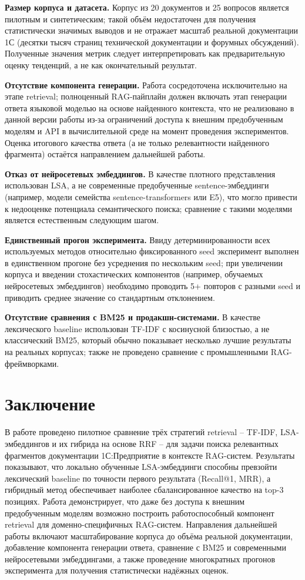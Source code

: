 \documentclass[11pt]{article}
\begin{document}
\textbf{Размер корпуса и датасета.} Корпус из 20 документов и 25 вопросов
является пилотным и синтетическим; такой объём недостаточен для получения
статистически значимых выводов и не отражает масштаб реальной документации
1С (десятки тысяч страниц технической документации и форумных обсуждений).
Полученные значения метрик следует интерпретировать как предварительную
оценку тенденций, а не как окончательный результат.

\textbf{Отсутствие компонента генерации.} Работа сосредоточена
исключительно на этапе retrieval; полноценный RAG-пайплайн должен включать
этап генерации ответа языковой моделью на основе найденного контекста, что
не реализовано в данной версии работы из-за ограничений доступа к внешним
предобученным моделям и API в вычислительной среде на момент проведения
экспериментов. Оценка итогового качества ответа (а не только релевантности
найденного фрагмента) остаётся направлением дальнейшей работы.

\textbf{Отказ от нейросетевых эмбеддингов.} В качестве плотного
представления использован LSA, а не современные предобученные
sentence-эмбеддинги (например, модели семейства sentence-transformers или
E5), что могло привести к недооценке потенциала семантического поиска;
сравнение с такими моделями является естественным следующим шагом.

\textbf{Единственный прогон эксперимента.} Ввиду детерминированности всех
используемых методов относительно фиксированного seed эксперимент выполнен
в единственном прогоне без усреднения по нескольким seed; при увеличении
корпуса и введении стохастических компонентов (например, обучаемых
нейросетевых эмбеддингов) необходимо проводить 5+ повторов с разными seed и
приводить среднее значение со стандартным отклонением.

\textbf{Отсутствие сравнения с BM25 и продакшн-системами.} В качестве
лексического baseline использован TF-IDF с косинусной близостью, а не
классический BM25, который обычно показывает несколько лучшие результаты
на реальных корпусах; также не проведено сравнение с промышленными
RAG-фреймворками.

\section{Заключение}

В работе проведено пилотное сравнение трёх стратегий retrieval -- TF-IDF,
LSA-эмбеддингов и их гибрида на основе RRF -- для задачи поиска релевантных
фрагментов документации 1С:Предприятие в контексте RAG-систем. Результаты
показывают, что локально обученные LSA-эмбеддинги способны превзойти
лексический baseline по точности первого результата (Recall@1, MRR), а
гибридный метод обеспечивает наиболее сбалансированное качество на
top-3 позициях. Работа демонстрирует, что даже без доступа к внешним
предобученным моделям возможно построить работоспособный компонент
retrieval для доменно-специфичных RAG-систем. Направления дальнейшей
работы включают масштабирование корпуса до объёма реальной документации,
добавление компонента генерации ответа, сравнение с BM25 и современными
нейросетевыми эмбеддингами, а также проведение многократных прогонов
эксперимента для получения статистически надёжных оценок.
\end{document}
